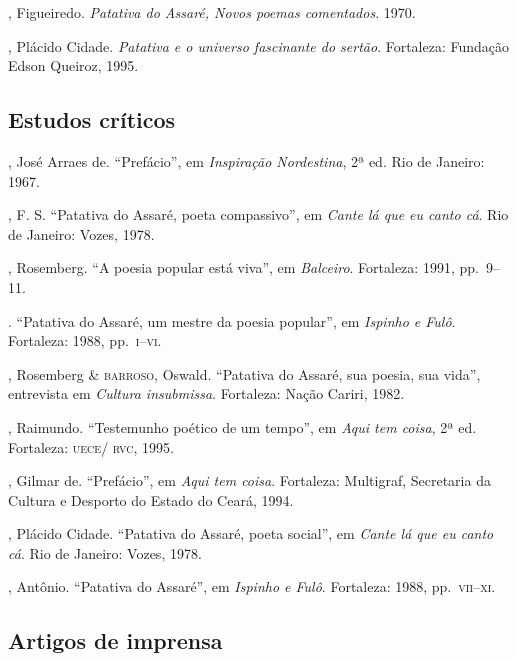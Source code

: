 \begin{bibliohedra}[]

, Figueiredo. \textit{Patativa do Assaré, Novos poemas 
comentados}. 1970.

, Plácido Cidade. \textit{Patativa e o universo fascinante
do sertão}. Fortaleza: Fundação Edson Queiroz, 1995.

\end{bibliohedra}

\subsection{Estudos críticos}

\begin{bibliohedra}[]

, José Arraes de. “Prefácio”, em \textit{Inspiração
Nordestina}, 2ª ed. Rio de Janeiro: 1967.

, F. S. ``Patativa do Assaré, poeta compassivo'', 
em \textit{Cante lá que eu canto cá}. Rio de Janeiro: Vozes, 
1978.

, Rosemberg. “A poesia popular está viva”, em 
\textit{Balceiro}. Fortaleza: 1991, pp.~9--11. 

\titidem. “Patativa do Assaré, um mestre da poesia popular”,
em \textit{Ispinho e Fulô}. Fortaleza: 1988, pp.~\textsc{i--vi}.

, Rosemberg \& \textsc{barroso}, Oswald. “Patativa do 
Assaré, sua poesia, sua vida”, entrevista em \textit{Cultura 
insubmissa}. Fortaleza: Nação Cariri, 1982.

, Raimundo. “Testemunho poético de um 
tempo”, em \textit{Aqui tem coisa}, 2ª ed. Fortaleza: \textsc{uece/
rvc}, 1995. 

, Gilmar de. “Prefácio”, em \textit{Aqui tem coisa}. 
Fortaleza: Multigraf, Secretaria da Cultura 
e Desporto do Estado do Ceará, 1994. 

, Plácido Cidade. “Patativa do Assaré, poeta 
social”, em \textit{Cante lá que eu canto cá}. Rio de Janeiro: 
Vozes, 1978.

, Antônio. “Patativa do Assaré”, em \textit{Ispinho e
Fulô}. Fortaleza: 1988, pp.~\textsc{vii--xi}.

\end{bibliohedra}

\subsection{Artigos de imprensa}

